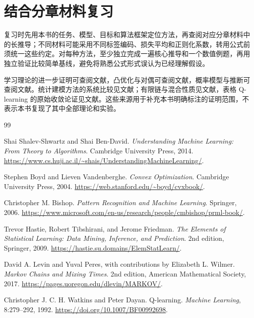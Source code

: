 \documentclass[UTF8,12pt,a4paper,fontset=fandol]{ctexbook}
\begin{document}
\section{结合分章材料复习}

复习时先用本书的任务、模型、目标和算法框架定位方法，再查阅对应分章材料中的长推导；不同材料可能采用不同标签编码、损失平均和正则化系数，转用公式前须统一这些约定。对每种方法，至少独立完成一遍核心推导和一个数值例题，再用独立验证比较简单基线，避免将熟悉公式形式误认为已经理解假设。

学习理论的进一步证明可查阅文献\cite{ml-uml}，凸优化与对偶可查阅文献\cite{ml-convex}，概率模型与推断可查阅文献\cite{ml-prml}。统计建模方法的系统比较见文献\cite{ml-esl}；有限链与混合性质见文献\cite{ml-markov}，表格 Q-learning 的原始收敛论证见文献\cite{ml-qlearning}。这些来源用于补充本书明确标注的证明范围，不表示本书复现了其中全部理论和实验。


\backmatter
\begin{thebibliography}{99}

Shai Shalev-Shwartz and Shai Ben-David.
\emph{Understanding Machine Learning: From Theory to Algorithms}.
Cambridge University Press, 2014.
\url{https://www.cs.huji.ac.il/~shais/UnderstandingMachineLearning/}.

Stephen Boyd and Lieven Vandenberghe.
\emph{Convex Optimization}.
Cambridge University Press, 2004.
\url{https://web.stanford.edu/~boyd/cvxbook/}.

Christopher M. Bishop.
\emph{Pattern Recognition and Machine Learning}.
Springer, 2006.
\url{https://www.microsoft.com/en-us/research/people/cmbishop/prml-book/}.

Trevor Hastie, Robert Tibshirani, and Jerome Friedman.
\emph{The Elements of Statistical Learning: Data Mining, Inference, and Prediction}.
2nd edition, Springer, 2009.
\url{https://hastie.su.domains/ElemStatLearn/}.

David A. Levin and Yuval Peres, with contributions by Elizabeth L. Wilmer.
\emph{Markov Chains and Mixing Times}.
2nd edition, American Mathematical Society, 2017.
\url{https://pages.uoregon.edu/dlevin/MARKOV/}.

Christopher J. C. H. Watkins and Peter Dayan.
Q-learning.
\emph{Machine Learning}, 8:279--292, 1992.
\url{https://doi.org/10.1007/BF00992698}.

\end{thebibliography}
\end{document}
